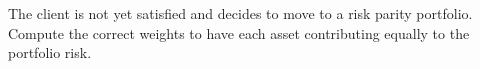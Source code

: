 %		
%

\begin{question}
The client is not yet satisfied and decides to move to a risk parity portfolio. Compute the correct weights to have each asset contributing equally to the portfolio risk.
\end{question}

